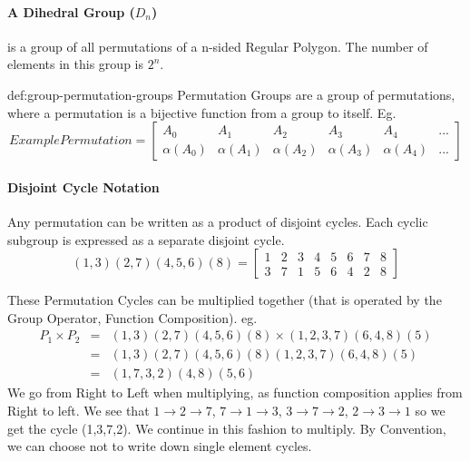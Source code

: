 \paragraph{A Dihedral Group ($D_n$)} is a group of all permutations of a n-sided Regular
Polygon. The number of elements in this group is $2^n$.

\begin{definition}{def:group-permutation-groups}
    Permutation Groups are a group of permutations, where a permutation is a
    bijective function from a group to itself. Eg.
    \begin{equation}
        Example Permutation =
        \begin{bmatrix}
            A_0         & A_1         & A_2         & A_3         & A_4         & ... \\
            \alpha(A_0) & \alpha(A_1) & \alpha(A_2) & \alpha(A_3) & \alpha(A_4) & ...
        \end{bmatrix}
    \end{equation}
\end{definition}

\paragraph{Disjoint Cycle Notation} Any permutation can be written as a product of disjoint cycles.
Each cyclic subgroup is expressed as a separate disjoint cycle.
\begin{equation}
    (1,3)(2,7)(4,5,6)(8) =
    \begin{bmatrix}
        1 & 2 & 3 & 4 & 5 & 6 & 7 & 8 \\
        3 & 7 & 1 & 5 & 6 & 4 & 2 & 8
    \end{bmatrix}
\end{equation}

These Permutation Cycles can be multiplied together (that is operated by the Group Operator, Function Composition). eg.
\begin{eqnarray*}
    P_1 \times P_2
    & = & (1,3)(2,7)(4,5,6)(8) \times (1,2,3,7)(6,4,8)(5) \\
    & = & (1,3)(2,7)(4,5,6)(8)(1,2,3,7)(6,4,8)(5) \\
    & = & (1,7,3,2)(4,8)(5,6)
\end{eqnarray*}
We go from Right to Left when multiplying, as function composition applies from Right to left.
We see that $1 \rightarrow 2 \rightarrow 7$, $7 \rightarrow 1 \rightarrow 3$, $3 \rightarrow 7 \rightarrow 2$, $2 \rightarrow 3 \rightarrow 1$ so we get the cycle (1,3,7,2). We continue in this fashion to multiply.
By Convention, we can choose not to write down single element cycles.

